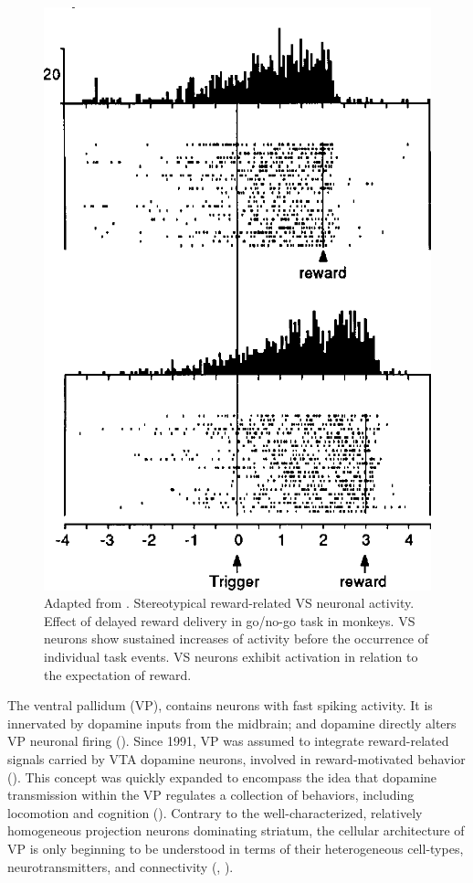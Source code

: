 \begin{figure}[H]
    \centering
    \includegraphics[scale=0.22]{figures/StriatumR.png}
    \caption{Adapted from . Stereotypical reward-related VS neuronal activity. Effect of delayed reward delivery in go/no-go task in monkeys. VS neurons show sustained increases of activity before the occurrence of individual task events. VS neurons exhibit activation in relation to the expectation of reward.}
    \label{fig:StriatumN}
\end{figure}
The ventral pallidum (VP), contains neurons with fast spiking activity. It is innervated by dopamine inputs from the midbrain; and dopamine directly alters VP neuronal firing (\cite{Napier89}). Since 1991, VP was assumed to integrate reward-related signals carried by VTA dopamine neurons, involved in reward-motivated behavior (\cite{Napier91}). This concept was quickly expanded to encompass the idea that dopamine transmission within the VP regulates a collection of behaviors, including locomotion and cognition (\cite{Napier92}). Contrary to the well-characterized, relatively homogeneous projection neurons dominating striatum, the cellular architecture of VP is only beginning to be understood in terms of their heterogeneous cell-types, neurotransmitters, and connectivity (\cite{Heimer1997}, \cite{Tachibana2012}). 
